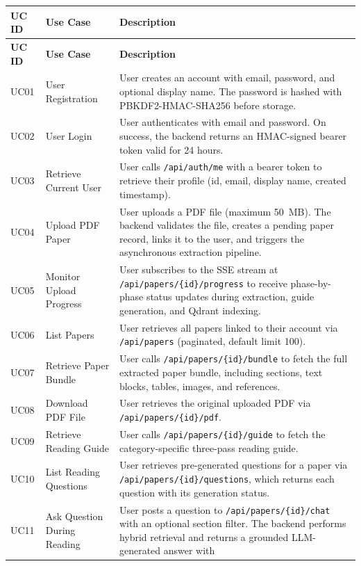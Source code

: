 \documentclass[12pt,a4paper]{report}
\begin{document}
\begin{longtable}{|p{1.2cm}|p{3.5cm}|p{9.3cm}|}
\hline
\textbf{UC ID} & \textbf{Use Case} & \textbf{Description} \\
\hline
\endfirsthead
\hline
\textbf{UC ID} & \textbf{Use Case} & \textbf{Description} \\
\hline
\endhead
UC01 & User Registration & User creates an account with email, password, and
optional display name. The password is hashed with PBKDF2-HMAC-SHA256 before
storage. \\
\hline
UC02 & User Login & User authenticates with email and password. On success,
the backend returns an HMAC-signed bearer token valid for 24 hours. \\
\hline
UC03 & Retrieve Current User & User calls \texttt{/api/auth/me} with a bearer
token to retrieve their profile (id, email, display name, created timestamp). \\
\hline
UC04 & Upload PDF Paper & User uploads a PDF file (maximum 50~MB). The backend
validates the file, creates a pending paper record, links it to the user, and
triggers the asynchronous extraction pipeline. \\
\hline
UC05 & Monitor Upload Progress & User subscribes to the SSE stream at
\texttt{/api/papers/\{id\}/progress} to receive phase-by-phase status updates
during extraction, guide generation, and Qdrant indexing. \\
\hline
UC06 & List Papers & User retrieves all papers linked to their account via
\texttt{/api/papers} (paginated, default limit 100). \\
\hline
UC07 & Retrieve Paper Bundle & User calls \texttt{/api/papers/\{id\}/bundle}
to fetch the full extracted paper bundle, including sections, text blocks,
tables, images, and references. \\
\hline
UC08 & Download PDF File & User retrieves the original uploaded PDF via
\texttt{/api/papers/\{id\}/pdf}. \\
\hline
UC09 & Retrieve Reading Guide & User calls \texttt{/api/papers/\{id\}/guide}
to fetch the category-specific three-pass reading guide. \\
\hline
UC10 & List Reading Questions & User retrieves pre-generated questions for a
paper via \texttt{/api/papers/\{id\}/questions}, which returns each question
with its generation status. \\
\hline
UC11 & Ask Question During Reading & User posts a question to
\texttt{/api/papers/\{id\}/chat} with an optional section filter. The backend
performs hybrid retrieval and returns a grounded LLM-generated answer with

\end{longtable}
\end{document}
